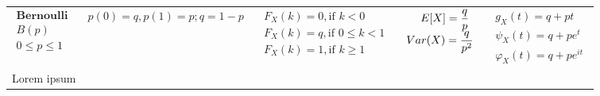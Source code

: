 \documentclass{article}
\begin{document}
\begin{landscape}
\begin{table}[ht]
\begin{tabular}{@{}l p{6.0cm} p{5cm} p{3.0cm} r@{}}
        $\begin{array}{l}
            \textbf{Bernoulli} \\
            B(p) \\
            0 \leq p \leq 1
    \end{array}$ & 
    $\begin{array}{l}
    \displaystyle p(0) = q, p(1) = p; q = 1-p\\
    \end{array}$ & 
    $\begin{array}{l}
        \displaystyle F_X(k) = 0, \text{if } k < 0\\
        \displaystyle F_X(k) = q, \text{if } 0\leq k < 1 \\
        \displaystyle F_X(k) = 1, \text{if } k \geq 1 \\
    \end{array}$ & 
    $\begin{array}{l}
    \displaystyle \hspace{0.45cm}  E[X] = \frac{q}{p} \\
    \displaystyle Var(X) = \frac{q}{p^2}
    \end{array}$ & 
    $\begin{array}{r}
    \displaystyle g_X(t) = q+pt \\
    \displaystyle \psi_X(t) = q+pe^{t} \\
    \displaystyle \varphi_X(t) = q+pe^{it}
    \end{array}$ \\
    \multicolumn{4}{p{19cm}}{Lorem ipsum} \\
    

\end{tabular}
\end{table}
\end{landscape}
\end{document}
